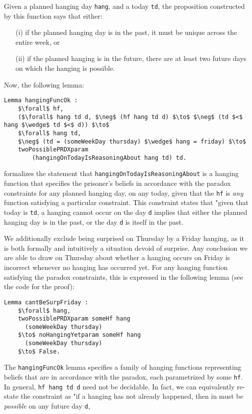 \documentclass[runningheads]{llncs}
\begin{document}
Given a planned hanging day {\tt hang}, and a today {\tt td}, the proposition
constructed by this function says that either:

\begin{itemize}
  \item[(i)] if the planned hanging day is in the past, it must be unique across
  the entire week, or
  \item[(ii)] if the planned hanging is in the future, there are at least two
  future days on which the hanging is possible.
\end{itemize}

Now, the following lemma:

\begin{lstlisting}[mathescape=true]
Lemma hangingFuncOk :
    $\forall$ hf,
    ($\forall$ hang td d, $\neg$ (hf hang td d) $\to$ $\neg$ (td $<$ hang $\wedge$ td $<$ d)) $\to$
    $\forall$ hang td,
    $\neg$ (td = (someWeekDay thursday) $\wedge$ hang = friday) $\to$
    twoPossiblePRDXparam
        (hangingOnTodayIsReasoningAbout hang td) td.
\end{lstlisting}

formalizes the statement that {\tt hangingOnTodayIsReasoningAbout}
is a hanging function that specifies the prisoner's beliefs in accordance with
the paradox constraints for any planned hanging day, on any today, given that
the {\tt hf} is \emph{any} function satisfying a particular constraint.
This constraint states that "given that today is {\tt td}, a hanging
cannot occur on
the day {\tt d} implies that either the planned hanging day is in the past, or the day
{\tt d} is itself in the past.

We additionally exclude being surprised
on Thursday by a Friday hanging, as it is both formally and intuitively a
situation devoid
of surprise. Any conclusion we are able to draw on Thursday about whether a
hanging occurs
on Friday is incorrect whenever no hanging has occurred yet. For any hanging function satisfying the paradox constraints,
this is expressed in the following lemma (see the code for the proof):

\begin{lstlisting}[mathescape=true]
  Lemma cantBeSurpFriday :
    $\forall$ hang,
    twoPossiblePRDXparam someHf hang
      (someWeekDay thursday)
    $\to$ noHangingYetparam someHf hang
      (someWeekDay thursday)
    $\to$ False.
\end{lstlisting}

The {\tt hangingFuncOk} lemma specifies a family of hanging functions
representing beliefs that
are in accordance with the paradox, each parametrized by some {\tt hf}.
In general, {\tt hf hang td d} need not be
decidable. In fact, we can equivalently re-state
the constraint as "if a hanging has not already happened, then in must be
\emph{possible} on any future day {\tt d},
\end{document}
